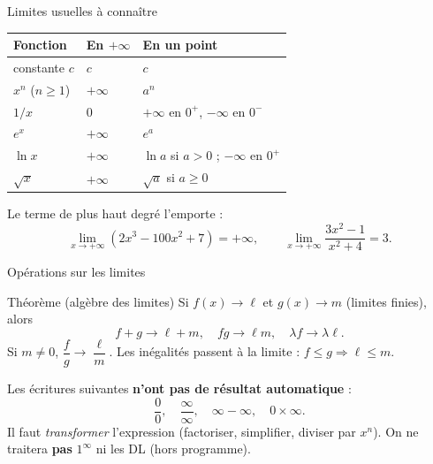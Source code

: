 \documentclass[10pt,aspectratio=169]{beamer}
\numberwithin{dummy}{section}
\begin{document}
\begin{frame}{Limites usuelles à connaître}
\renewcommand{\arraystretch}{1.25}
{\small
\begin{center}
\begin{tabular}{@{}lll@{}}
\toprule
\textbf{Fonction} & \textbf{En $+\infty$} & \textbf{En un point} \\
\midrule
constante $c$ & $c$ & $c$ \\
$x^n$ ($n\geqslant 1$) & $+\infty$ & $a^n$ \\
$1/x$ & $0$ & $+\infty$ en $0^+$, $-\infty$ en $0^-$ \\
$e^x$ & $+\infty$ & $e^a$ \\
$\ln x$ & $+\infty$ & $\ln a$ si $a>0$ ; $-\infty$ en $0^+$ \\
$\sqrt{x}$ & $+\infty$ & $\sqrt{a}$ si $a\geqslant 0$ \\
\bottomrule
\end{tabular}
\end{center}
}

\vspace{0.4em}
\begin{boxsynthese}
Le terme de plus haut degré l'emporte :
\[
\lim_{x\to+\infty}(2x^3-100x^2+7)=+\infty,
\qquad
\lim_{x\to+\infty}\frac{3x^2-1}{x^2+4}=3.
\]
\end{boxsynthese}
\end{frame}

\begin{frame}{Opérations sur les limites}
\begin{block}{Théorème (algèbre des limites)}
Si $f(x)\to\ell$ et $g(x)\to m$ (limites finies), alors
\[
f+g\to \ell+m,\quad
fg\to \ell m,\quad
\lambda f\to \lambda\ell.
\]
Si $m\neq 0$, $\dfrac{f}{g}\to\dfrac{\ell}{m}$.
Les inégalités passent à la limite : $f\leqslant g \Rightarrow \ell\leqslant m$.
\end{block}

\vspace{0.35em}
\begin{boxattention}
Les écritures suivantes \textbf{n'ont pas de résultat automatique} :
\[
\frac{0}{0},\quad \frac{\infty}{\infty},\quad \infty-\infty,\quad 0\times\infty.
\]
Il faut \emph{transformer} l'expression (factoriser, simplifier, diviser par $x^n$).
On ne traitera \textbf{pas} $1^\infty$ ni les DL (hors programme).
\end{boxattention}
\end{frame}
\end{document}
